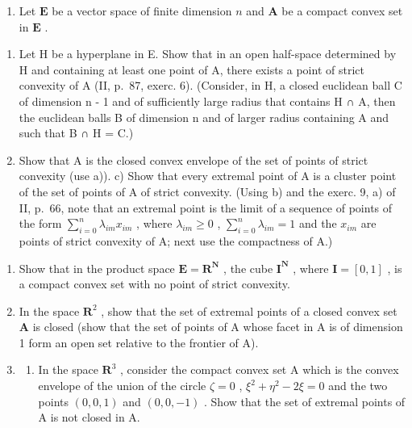 \begin{enumerate}
\def\labelenumi{\arabic{enumi})}
\setcounter{enumi}{7}
\tightlist
\item
  Let \(\mathbf{E}\) be a vector space of finite dimension \(n\) and \(\mathbf{A}\) be a compact convex set in \(\mathbf{E}\) .
\end{enumerate}

\begin{enumerate}
\def\labelenumi{\alph{enumi})}
\item
  Let H be a hyperplane in E. Show that in an open half-space determined by H and containing at least one point of A, there exists a point of strict convexity of A (II, p.~87, exerc. 6). (Consider, in H, a closed euclidean ball C of dimension n - 1 and of sufficiently large radius that contains H ∩ A, then the euclidean balls B of dimension n and of larger radius containing A and such that B ∩ H = C.)
\item
  Show that A is the closed convex envelope of the set of points of strict convexity (use a)). c) Show that every extremal point of A is a cluster point of the set of points of A of strict convexity. (Using b) and the exerc. 9, a) of II, p.~66, note that an extremal point is the limit of a sequence of points of the form \(\sum_{i=0}^{n} \lambda_{im} x_{im}\) , where \(\lambda_{im} \geqslant 0\) , \(\sum_{i=0}^{n} \lambda_{im} = 1\) and the \(x_{im}\) are points of strict convexity of A; next use the compactness of A.)
\end{enumerate}

\begin{enumerate}
\def\labelenumi{\arabic{enumi})}
\setcounter{enumi}{8}
\item
  Show that in the product space \(\mathbf{E} = \mathbf{R}^{\mathbf{N}}\) , the cube \(\mathbf{I}^{\mathbf{N}}\) , where \(\mathbf{I} = [0,1]\) , is a compact convex set with no point of strict convexity.
\item
  In the space \(\mathbf{R}^2\) , show that the set of extremal points of a closed convex set \(\mathbf{A}\) is closed (show that the set of points of A whose facet in A is of dimension 1 form an open set relative to the frontier of A).
\item
  \begin{enumerate}
  \def\labelenumii{\alph{enumii})}
  \tightlist
  \item
    In the space \(\mathbf{R}^3\) , consider the compact convex set A which is the convex envelope of the union of the circle \(\zeta = 0\) , \(\xi^2 + \eta^2 - 2\xi = 0\) and the two points \((0, 0, 1)\) and \((0, 0, -1)\) . Show that the set of extremal points of A is not closed in A.
  \end{enumerate}
\end{enumerate}

